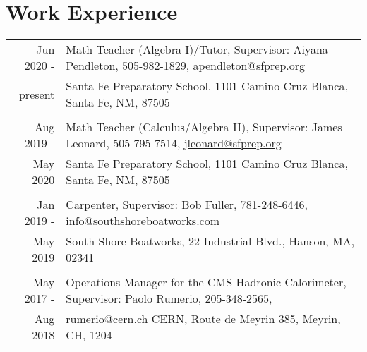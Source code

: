 \documentclass[letterpaper,11pt]{article} %
\begin{document}
\section{Work Experience}


\begingroup
\fontsize{10pt}{12pt}\selectfont

\begin{tabulary}{\textwidth}{RL}	

Jun 2020 - & Math Teacher (Algebra I)/Tutor, Supervisor: Aiyana Pendleton, 505-982-1829, \href{mailto:apendleton@sfprep.org}{apendleton@sfprep.org}  \\
 present    &  Santa Fe Preparatory School, 1101 Camino Cruz Blanca, Santa Fe, NM, 87505 \\ 
%
\vspace{5pt} \\

Aug 2019 -     & Math Teacher (Calculus/Algebra II), Supervisor: James Leonard, 505-795-7514, \href{mailto:jleonard@sfprep.org}{jleonard@sfprep.org} \\
 May 2020       & Santa Fe Preparatory School, 1101 Camino Cruz Blanca, Santa Fe, NM, 87505 \\ %

\vspace{5pt} \\

Jan 2019 -     & Carpenter, Supervisor: Bob Fuller, 781-248-6446, \href{mailto:info@southshoreboatworks.com}{info@southshoreboatworks.com} \\
 May 2019      & South Shore Boatworks, 22 Industrial Blvd., Hanson, MA, 02341 \\ %

\vspace{5pt} \\

May 2017 -     & Operations Manager for the CMS Hadronic Calorimeter, Supervisor: Paolo Rumerio, 205-348-2565, \\
 Aug 2018      & \href{mailto:rumerio@cern.ch}{rumerio@cern.ch} CERN, Route de Meyrin 385, Meyrin, CH, 1204 \\ %


\end{tabulary}
\end{document}
